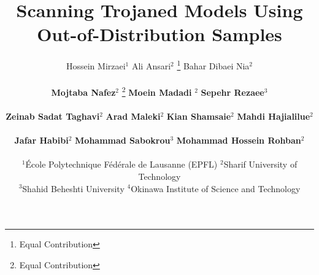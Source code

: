 \documentclass[final]{article}
\title{Scanning Trojaned Models Using Out-of-Distribution Samples}
\theoremstyle{plain}
\theoremstyle{definition}
\theoremstyle{remark}
\begin{document}


% 
\begingroup
   \renewcommand{\thefootnote}{}%
\endgroup

\author{
Hossein Mirzaei$^{1}$ \quad Ali Ansari$^{2}$ \thanks{Equal Contribution} \quad Bahar Dibaei Nia$^{2}$ \footnotemark[1] \\ \\
\textbf{Mojtaba Nafez}$^2$ \thanks{Equal Contribution} \quad \textbf{Moein Madadi} $^2$ \footnotemark[2] \quad
\textbf{Sepehr Rezaee}$^3$ \footnotemark[2] \\ \\
\quad \textbf{Zeinab Sadat Taghavi}$^2$ \quad \textbf{Arad Maleki}$^2$ \quad \textbf{Kian Shamsaie}$^2$ \quad \textbf{Mahdi Hajialilue}$^2$ \\ \\ \quad \textbf{Jafar Habibi}$^2$ \quad \textbf{Mohammad Sabokrou}$^3$ \quad \textbf{ Mohammad Hossein Rohban}$^2$\\
\\
$^1$École Polytechnique Fédérale de Lausanne (EPFL) \quad $^2$Sharif University of Technology \\ \quad $^3$Shahid Beheshti University  \quad $^4$Okinawa Institute of Science and Technology\\
}
\end{document}

